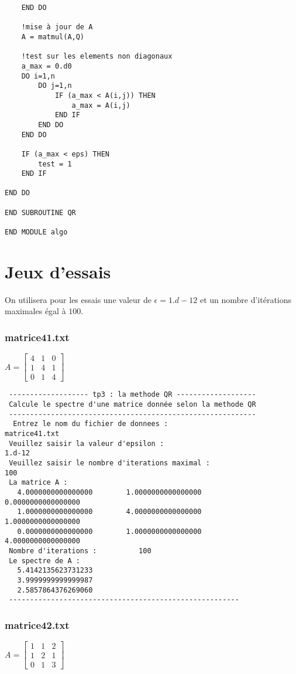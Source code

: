 \documentclass{report}
\begin{document}
\begin{small}
\begin{verbatim}
    END DO

    !mise à jour de A
    A = matmul(A,Q)

    !test sur les elements non diagonaux
    a_max = 0.d0
    DO i=1,n
        DO j=1,n
            IF (a_max < A(i,j)) THEN
                a_max = A(i,j)
            END IF
        END DO
    END DO

    IF (a_max < eps) THEN
        test = 1
    END IF

END DO

END SUBROUTINE QR

END MODULE algo
\end{verbatim}
\end{small}

\newpage
\section{Jeux d'essais}\label{essai}
On utilisera pour les essais une valeur de $\epsilon = 1.d-12$ et un nombre
d'itérations maximales égal à $100$.
\subsubsection{matrice41.txt}
$A=\left[\begin{array}{rrrr}
4 & 1 & 0 \\
1 & 4 & 1 \\
0 & 1 & 4
\end{array}\right]$

\begin{small}
\begin{verbatim}
 ------------------- tp3 : la methode QR -------------------
 Calcule le spectre d'une matrice donnée selon la methode QR
 -----------------------------------------------------------
  Entrez le nom du fichier de donnees : 
matrice41.txt
 Veuillez saisir la valeur d'epsilon : 
1.d-12
 Veuillez saisir le nombre d'iterations maximal : 
100
 La matrice A :
   4.0000000000000000        1.0000000000000000        0.0000000000000000
   1.0000000000000000        4.0000000000000000        1.0000000000000000
   0.0000000000000000        1.0000000000000000        4.0000000000000000
 Nombre d'iterations :          100
 Le spectre de A : 
   5.4142135623731233     
   3.9999999999999987     
   2.5857864376269060     
 -------------------------------------------------------
\end{verbatim}
\end{small}

\subsubsection{matrice42.txt}
$A=\left[\begin{array}{rrrr}
1 & 1 & 2 \\
1 & 2 & 1 \\
0 & 1 & 3
\end{array}\right]$
\end{document}

